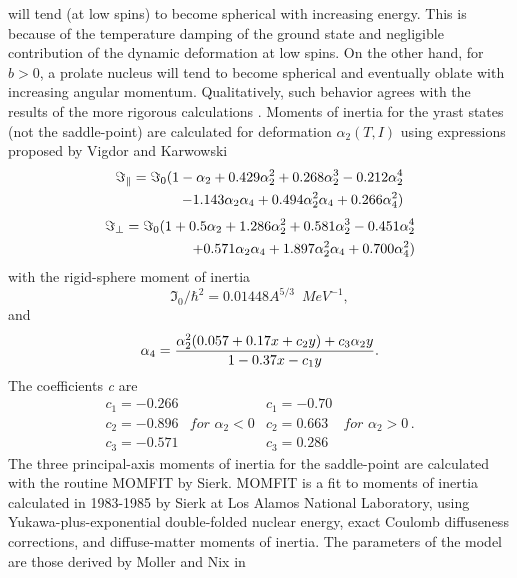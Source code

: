 will tend (at low spins) to become spherical with increasing energy. This is
because of the temperature damping of the ground state and negligible
contribution of the dynamic deformation at low spins. On the other hand, for
$b>0$, a prolate nucleus will tend to become spherical and eventually oblate
with increasing angular momentum. Qualitatively, such behavior agrees with
the results of the more rigorous calculations \cite{and76}. Moments of
inertia for the yrast states (not the saddle-point) are calculated for
deformation $\alpha_{2}(T,I)$ using expressions proposed by Vigdor and
Karwowski \cite{VK}
\begin{eqnarray}
\Im_{\parallel}=\Im_{0}(1-\alpha_{2}+0.429\alpha_{2}^{2}+0.268%
\alpha_{2}^{3}-0.212\alpha_{2}^{4}  \notag \\
-1.143\alpha_{2}\alpha_{4}+0.494\alpha_{2}^{2}\alpha_{4}+0.266\alpha_{4}^{2})
\label{MOMpar}
\end{eqnarray}
\begin{eqnarray}
\Im_{\perp}=\Im_{0}(1+0.5\alpha_{2}+1.286\alpha_{2}^{2}+0.581%
\alpha_{2}^{3}-0.451\alpha_{2}^{4}  \notag \\
+0.571\alpha_{2}\alpha_{4}+1.897\alpha_{2}^{2}\alpha_{4}+0.700\alpha_{4}^{2})
\label{MOMort}
\end{eqnarray}
with the rigid-sphere moment of inertia
\begin{equation}
\Im_{0}/\hbar^{2}=0.01448A^{5/3}\,\,\, MeV^{-1},
\end{equation}
and
\begin{equation}
\alpha_{4}=\frac{\alpha_{2}^{2}(0.057+0.17x+c_{2}y)+c_{3}\alpha_{2}y}{%
1-0.37x-c_{1}y}.
\end{equation}
The coefficients \emph{c} are
\begin{equation}
\begin{array}{llll}
c_{1}=-0.266 &  & c_{1}=-0.70 &  \\
c_{2}=-0.896 & for\,\,\alpha_{2}<0 & c_{2}=0.663 & for\,\,\alpha_{2}>0\,. \\
c_{3}=-0.571 &  & c_{3}=0.286 &
\end{array}%
\end{equation}
The three principal-axis moments of inertia for the saddle-point are
calculated with the routine MOMFIT \cite{sierk} by Sierk. MOMFIT is a fit to
moments of inertia calculated in 1983-1985 by Sierk at Los Alamos National
Laboratory, using Yukawa-plus-exponential double-folded nuclear energy,
exact Coulomb diffuseness corrections, and diffuse-matter moments of
inertia. The parameters of the model are those derived by Moller and Nix in
